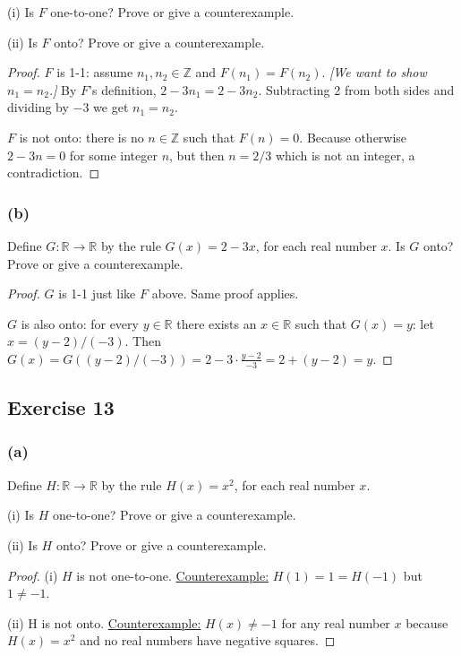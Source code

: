 \documentclass[14pt]{extarticle}
\newcommand{\dps}{\displaystyle}
\newcommand{\R}{\mathbb{R}}
\newcommand{\Z}{\mathbb{Z}}
\begin{document}
(i) Is $F$ one-to-one? Prove or give a counterexample.

(ii) Is $F$ onto? Prove or give a counterexample.

\begin{proof}
    $F$ is 1-1: assume \(n_1, n_2 \in \Z\) and \(F(n_1) = F(n_2)\). {\it [We want to show \(n_1 = n_2\).]} By $F$'s
    definition, \(2 - 3n_1 = 2-3n_2\). Subtracting 2 from both sides and dividing by $-3$ we get \(n_1 = n_2\).

    $F$ is not onto: there is no \(n \in \Z\) such that \(F(n) = 0\). Because otherwise \(2 - 3n = 0\) for some integer
    $n$, but then \(n = 2/3\) which is not an integer, a contradiction.
\end{proof}

\subsubsection{(b)}
Define \(G: \R \to \R\) by the rule \(G(x) = 2 - 3x\), for each real number $x$. Is $G$ onto? Prove or give a counterexample.

\begin{proof}
    $G$ is 1-1 just like $F$ above. Same proof applies.

    $G$ is also onto: for every $y \in \R$ there exists an $x \in \R$ such that $G(x) = y$: let \(x = (y - 2) / (-3)\).
    Then \(\dps G(x) = G((y - 2) / (-3)) = 2 - 3 \cdot \frac{y-2}{-3} = 2 + (y-2) = y\).
\end{proof}

\subsection{Exercise 13}
\subsubsection{(a)}
Define \(H: \R \to \R\) by the rule \(H(x) = x^2\), for each real number $x$.

(i) Is $H$ one-to-one? Prove or give a counterexample.

(ii) Is $H$ onto? Prove or give a counterexample.

\begin{proof}
    (i) $H$ is not one-to-one. \underline{Counterexample:} \(H(1) = 1 = H(-1)\) but \(1 \neq -1\).

    (ii) H is not onto. \underline{Counterexample:} \(H(x) \neq -1\) for any real number $x$ because \(H(x) = x^2\) and no
    real numbers have negative squares.
\end{proof}
\end{document}
